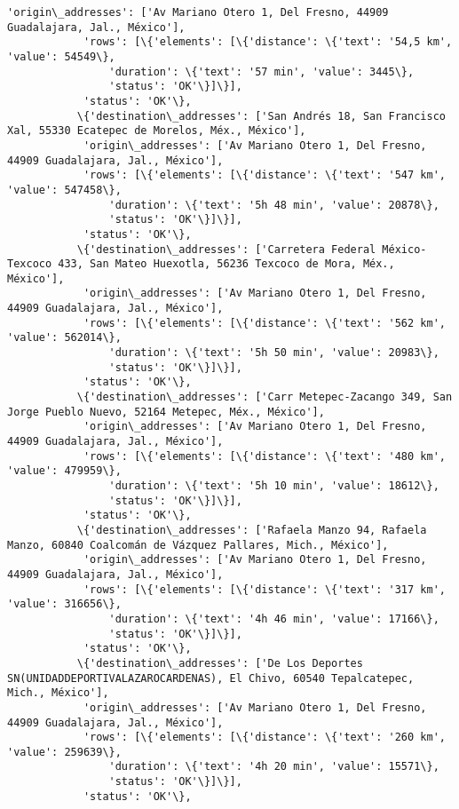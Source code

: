 \documentclass[11pt]{article}
\begin{document}
\begin{Verbatim}[commandchars=\\\{\}]
            'origin\_addresses': ['Av Mariano Otero 1, Del Fresno, 44909 Guadalajara, Jal., México'],
            'rows': [\{'elements': [\{'distance': \{'text': '54,5 km', 'value': 54549\},
                'duration': \{'text': '57 min', 'value': 3445\},
                'status': 'OK'\}]\}],
            'status': 'OK'\},
           \{'destination\_addresses': ['San Andrés 18, San Francisco Xal, 55330 Ecatepec de Morelos, Méx., México'],
            'origin\_addresses': ['Av Mariano Otero 1, Del Fresno, 44909 Guadalajara, Jal., México'],
            'rows': [\{'elements': [\{'distance': \{'text': '547 km', 'value': 547458\},
                'duration': \{'text': '5h 48 min', 'value': 20878\},
                'status': 'OK'\}]\}],
            'status': 'OK'\},
           \{'destination\_addresses': ['Carretera Federal México-Texcoco 433, San Mateo Huexotla, 56236 Texcoco de Mora, Méx., México'],
            'origin\_addresses': ['Av Mariano Otero 1, Del Fresno, 44909 Guadalajara, Jal., México'],
            'rows': [\{'elements': [\{'distance': \{'text': '562 km', 'value': 562014\},
                'duration': \{'text': '5h 50 min', 'value': 20983\},
                'status': 'OK'\}]\}],
            'status': 'OK'\},
           \{'destination\_addresses': ['Carr Metepec-Zacango 349, San Jorge Pueblo Nuevo, 52164 Metepec, Méx., México'],
            'origin\_addresses': ['Av Mariano Otero 1, Del Fresno, 44909 Guadalajara, Jal., México'],
            'rows': [\{'elements': [\{'distance': \{'text': '480 km', 'value': 479959\},
                'duration': \{'text': '5h 10 min', 'value': 18612\},
                'status': 'OK'\}]\}],
            'status': 'OK'\},
           \{'destination\_addresses': ['Rafaela Manzo 94, Rafaela Manzo, 60840 Coalcomán de Vázquez Pallares, Mich., México'],
            'origin\_addresses': ['Av Mariano Otero 1, Del Fresno, 44909 Guadalajara, Jal., México'],
            'rows': [\{'elements': [\{'distance': \{'text': '317 km', 'value': 316656\},
                'duration': \{'text': '4h 46 min', 'value': 17166\},
                'status': 'OK'\}]\}],
            'status': 'OK'\},
           \{'destination\_addresses': ['De Los Deportes SN(UNIDADDEPORTIVALAZAROCARDENAS), El Chivo, 60540 Tepalcatepec, Mich., México'],
            'origin\_addresses': ['Av Mariano Otero 1, Del Fresno, 44909 Guadalajara, Jal., México'],
            'rows': [\{'elements': [\{'distance': \{'text': '260 km', 'value': 259639\},
                'duration': \{'text': '4h 20 min', 'value': 15571\},
                'status': 'OK'\}]\}],
            'status': 'OK'\},

\end{Verbatim}
\end{document}
